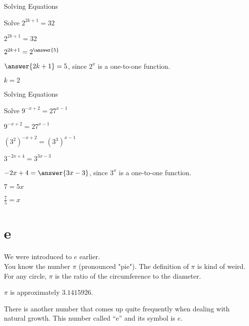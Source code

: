\documentclass{ximera}
\begin{document}
\begin{example} Solving Equations


Solve $2^{2k+1} = 32$


\begin{explanation}
$2^{2k+1} = 32$

$2^{2k+1} = 2^{\answer{5}}$

$\answer{2k + 1} = 5$, since $2^x$ is a one-to-one function.

$k = 2$
\end{explanation}
\end{example}






\begin{example} Solving Equations


Solve $9^{-x + 2} = 27^{x-1}$


\begin{explanation}

$9^{-x + 2} = 27^{x-1}$

$(3^2)^{-x + 2} = (3^3)^{x-1}$

$3^{-2x+4} = 3^{3x-3}$    

$-2x + 4 = \answer{3x - 3}$, since $3^x$ is a one-to-one function.

$7 = 5x$


$\frac{7}{5} = x$
\end{explanation}
\end{example}














\section*{e}


We were introduced to $e$ earlier. \\

You know the number $\pi$ (pronounced "pie").  The definition of $\pi$ is kind of weird.  For any circle, $\pi$ is the ratio of the circumference to the diameter.

$\pi$ is approximately $3.1415926$.





There is another number that comes up quite frequently when dealing with natural growth.  This number called ``e'' and its symbol is $e$.
\end{document}
